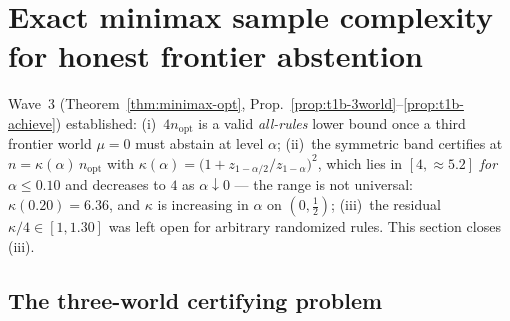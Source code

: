%
%
%
\providecommand{\TV}{\mathrm{TV}}
\section{Exact minimax sample complexity for honest frontier abstention}\label{sec:t1c-closure}

Wave~3 (Theorem~\ref{thm:minimax-opt}, Prop.~\ref{prop:t1b-3world}--\ref{prop:t1b-achieve})
established: (i)~$4n_{\mathrm{opt}}$ is a valid \emph{all-rules} lower bound once a third
frontier world $\mu=0$ must abstain at level $\alpha$; (ii)~the symmetric band certifies at
$n=\kappa(\alpha)\,n_{\mathrm{opt}}$ with
$\kappa(\alpha)=\bigl(1+z_{1-\alpha/2}/z_{1-\alpha}\bigr)^2$, which lies in $[4,\approx5.2]$
\emph{for $\alpha\le0.10$} and decreases to $4$ as $\alpha\downarrow0$ --- the range is not
universal: $\kappa(0.20)=6.36$, and $\kappa$ is increasing in $\alpha$ on $(0,\tfrac12)$;
(iii)~the residual $\kappa/4\in[1,1.30]$ was left open for arbitrary randomized rules.
This section closes (iii).

\subsection{The three-world certifying problem}

